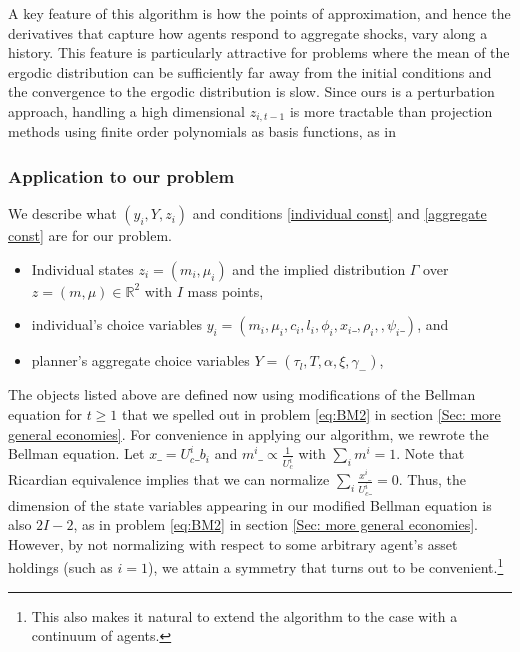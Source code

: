 \documentclass[thmsb,11pt]{article}
\begin{document}
A key feature of this algorithm is how the points of approximation, and hence the derivatives that capture how agents respond to aggregate shocks, vary along a history. This feature is particularly attractive for problems where the mean of the ergodic distribution can be sufficiently far away from the initial conditions and  the convergence to the ergodic distribution is slow. Since ours is a perturbation approach, handling a high dimensional $z_{i,t-1}$ is more tractable than projection methods using finite order polynomials as basis functions, as in \cite{Judd2011}


\subsubsection{Application to our problem}
We  describe what $\left(y_{i},Y,z_{i}\right)$ and conditions \eqref{individual const} and \eqref{aggregate const} are for our problem.

\begin{itemize}
\item Individual states $z_i= (m_i,\mu_i)$ and the implied distribution $\Gamma$ over $z= (m,\mu)\in \mathbb R^2$ with $I$ mass points,
\item individual's choice variables $y_i = (m_i,\mu_i,c_i,l_i,\phi_i,x_{i}\_,\rho_i,,\psi_{i}\_)$, and
\item planner's aggregate choice variables		$Y = (\tau_l,T,\alpha,\xi,\gamma_-)$,
\end{itemize}

The objects listed above are defined now using modifications of the Bellman equation for $t\geq 1$ that we spelled out in problem \eqref{eq:BM2} in section \ref{Sec: more general economies}. For convenience in applying our algorithm, we rewrote the Bellman equation.
 Let $x\_=U^i_c\_b_{i}$ and $m^i\_\propto \frac{1}{U^i_{c}}$ with $\sum_{i}m^i=1$. Note that Ricardian equivalence implies that we can normalize $\sum_{i}\frac{x^i\_}{U^i_c\_}=0$. Thus, the  dimension of the state variables appearing in our modified  Bellman equation is also $2I-2$, as in problem \eqref{eq:BM2} in section \ref{Sec: more general economies}. However, by not normalizing with respect to some arbitrary agent's asset holdings (such as $i=1$), we attain a symmetry that turns out to be convenient.\footnote{This also makes it natural to extend the algorithm to the case with a continuum of agents.}
\end{document}
